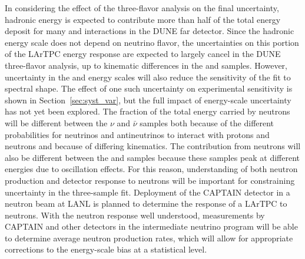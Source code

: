 In considering the effect of the three-flavor analysis on the final uncertainty, hadronic energy is expected
to contribute more than half of the total energy deposit for many \nue and \numu interactions in the DUNE
far detector. Since the hadronic energy scale does not depend on neutrino flavor, the uncertainties on this
portion of the LArTPC energy response are expected to largely cancel in the DUNE three-flavor analysis, up
to kinematic differences in the \nue and \numu samples. However, uncertainty in the \nue and \numu energy
scales will also reduce the sensitivity of the fit to spectral shape.
The effect of one such uncertainty on experimental sensitivity is shown in
Section~\ref{sec:syst_var}, but the full impact of energy-scale uncertainty has not yet been explored.
The fraction of the total energy carried by neutrons will be different between the $\nu$ and $\bar{\nu}$
samples both because of the different probabilities for neutrinos and antineutrinos to interact with
protons and neutrons and because of differing
kinematics. The contribution from neutrons will also be different between the \nue and \numu samples because
these samples peak at different energies due to oscillation effects. For this reason, understanding
of both neutron production and detector response to neutrons
will be important for constraining uncertainty in
the three-sample fit. Deployment of the CAPTAIN detector in a neutron beam at LANL is planned to
determine the response of a LArTPC to neutrons. With the neutron response well understood, measurements
by CAPTAIN and other detectors in the intermediate neutrino program will be able to determine
average neutron production rates, which will allow for appropriate corrections to the energy-scale bias at
a statistical level.

